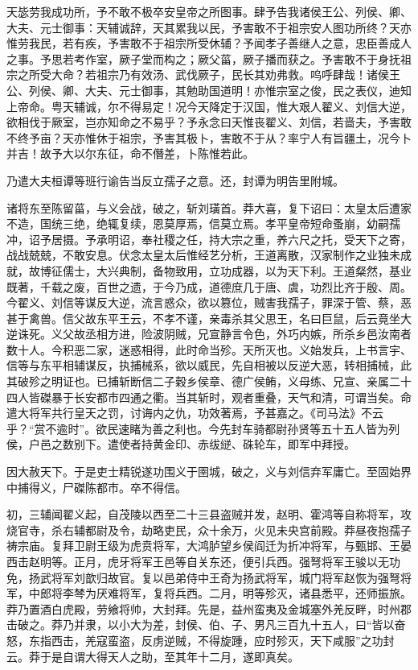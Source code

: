 \documentclass[12pt,UTF8]{ctexbook}
\begin{document}
天毖劳我成功所，予不敢不极卒安皇帝之所图事。肆予告我诸侯王公、列侯、卿、大夫、元士御事：天辅诚辞，天其累我以民，予害敢不于祖宗安人图功所终？天亦惟劳我民，若有疾，予害敢不于祖宗所受休辅？予闻孝子善继人之意，忠臣善成人之事。予思若考作室，厥子堂而构之；厥父菑，厥子播而获之。予害敢不于身抚祖宗之所受大命？若祖宗乃有效汤、武伐厥子，民长其劝弗救。呜呼肆哉！诸侯王公、列侯、卿、大夫、元士御事，其勉助国道明！亦惟宗室之俊，民之表仪，迪知上帝命。粤天辅诚，尔不得易定！况今天降定于汉国，惟大艰人翟义、刘信大逆，欲相伐于厥室，岂亦知命之不易乎？予永念曰天惟丧翟义、刘信，若啬夫，予害敢不终予亩？天亦惟休于祖宗，予害其极卜，害敢不于从？率宁人有旨疆土，况今卜并吉！故予大以尔东征，命不僭差，卜陈惟若此。



乃遣大夫桓谭等班行谕告当反立孺子之意。还，封谭为明告里附城。



诸将东至陈留菑，与义会战，破之，斩刘璜首。莽大喜，复下诏曰：太皇太后遭家不造，国统三绝，绝辄复续，恩莫厚焉，信莫立焉。孝平皇帝短命蚤崩，幼嗣孺冲，诏予居摄。予承明诏，奉社稷之任，持大宗之重，养六尺之托，受天下之寄，战战兢兢，不敢安息。伏念太皇太后惟经艺分析，王道离散，汉家制作之业独未成就，故博征儒士，大兴典制，备物致用，立功成器，以为天下利。王道粲然，基业既著，千载之废，百世之遗，于今乃成，道德庶几于唐、虞，功烈比齐于殷、周。今翟义、刘信等谋反大逆，流言惑众，欲以篡位，贼害我孺子，罪深于管、蔡，恶甚于禽兽。信父故东平王云，不孝不谨，亲毒杀其父思王，名曰巨鼠，后云竟坐大逆诛死。义父故丞相方进，险波阴贼，兄宣静言令色，外巧内嫉，所杀乡邑汝南者数十人。今积恶二家，迷惑相得，此时命当殄。天所灭也。义始发兵，上书言宇、信等与东平相辅谋反，执捕械系，欲以威民，先自相被以反逆大恶，转相捕械，此其破殄之明证也。已捕斩断信二子穀乡侯章、德广侯鲔，义母练、兄宣、亲属二十四人皆磔暴于长安都市四通之衢。当其斩时，观者重叠，天气和清，可谓当矣。命遣大将军共行皇天之罚，讨诲内之仇，功效著焉，予甚嘉之。《司马法》不云乎？“赏不逾时”。欲民速睹为善之利也。今先封车骑都尉孙贤等五十五人皆为列侯，户邑之数别下。遣使者持黄金印、赤绂縌、硃轮车，即军中拜授。



因大赦天下。于是吏士精锐遂功围义于圉城，破之，义与刘信弃军庸亡。至固始界中捕得义，尸磔陈都市。卒不得信。



初，三辅闻翟义起，自茂陵以西至二十三县盗贼并发，赵明、霍鸿等自称将军，攻烧官寺，杀右辅都尉及令，劫略吏民，众十余万，火见未央宫前殿。莽昼夜抱孺子祷宗庙。复拜卫尉王级为虎贲将军，大鸿胪望乡侯阎迁为折冲将军，与甄邯、王晏西击赵明等。正月，虎牙将军王邑等自关东还，便引兵西。强弩将军王骏以无功免，扬武将军刘歆归故官。复以邑弟侍中王奇为扬武将军，城门将军赵恢为强弩将军，中郎将李棽为厌难将军，复将兵西。二月，明等殄灭，诸县悉平，还师振旅。莽乃置酒白虎殿，劳飨将帅，大封拜。先是，益州蛮夷及金城塞外羌反畔，时州郡击破之。莽乃并隶，以小大为差，封侯、伯、子、男凡三百九十五人，曰“皆以奋怒，东指西击，羌寇蛮盗，反虏逆贼，不得旋踵，应时殄灭，天下咸服”之功封云。莽于是自谓大得天人之助，至其年十二月，遂即真矣。
\end{document}
